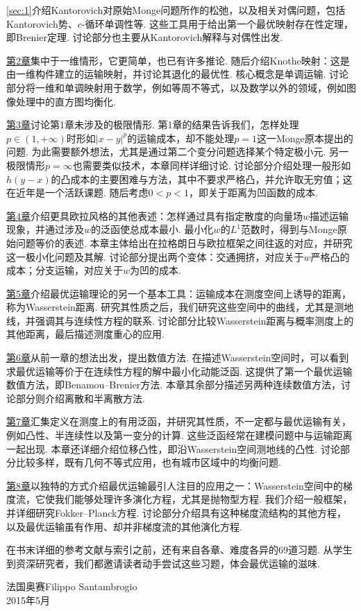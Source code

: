 \autoref{sec:1}介绍Kantorovich对原始Monge问题所作的松弛，以及相关对偶问题，包括Kantorovich势、$c$-循环单调性等. 这些工具用于给出第一个最优映射存在性定理，即Brenier定理. 讨论部分也主要从Kantorovich解释与对偶性出发.

\hyperref[sec:2]{第2章}集中于一维情形，它更简单，也已有许多推论. 随后介绍Knothe映射：这是由一维构件建立的运输映射，并讨论其退化的最优性. 核心概念是单调运输. 讨论部分将一维和单调映射用于数学，例如等周不等式，以及数学以外的领域，例如图像处理中的直方图均衡化.

\hyperref[sec:3]{第3章}讨论第1章未涉及的极限情形. 第1章的结果告诉我们，怎样处理$p\in(1,+\infty)$时形如$|x-y|^p$的运输成本，却不能处理$p=1$这一Monge原本提出的问题. 为此需要额外想法，尤其是通过第二个变分问题选择某个特定极小元. 另一极限情形$p=\infty$也需要类似技术，本章同样详细讨论. 讨论部分介绍处理一般形如$h(y-x)$的凸成本的主要困难与方法，其中不要求严格凸，并允许取无穷值；这在近年是一个活跃课题. 随后考虑$0<p<1$，即关于距离为凹函数的成本.

\hyperref[sec:4]{第4章}介绍更具欧拉风格的其他表述：怎样通过具有指定散度的向量场$w$描述运输现象，并通过涉及$w$的泛函使总成本最小. 最小化$w$的$L^1$范数时，得到与Monge原始问题等价的表述. 本章主体给出在拉格朗日与欧拉框架之间往返的对应，并研究这一极小化问题及其解. 讨论部分提出两个变体：交通拥挤，对应关于$w$严格凸的成本；分支运输，对应关于$w$为凹的成本.

\hyperref[sec:5]{第5章}介绍最优运输理论的另一个基本工具：运输成本在测度空间上诱导的距离，称为Wasserstein距离. 研究其性质之后，我们研究这些空间中的曲线，尤其是测地线，并强调其与连续性方程的联系. 讨论部分比较Wasserstein距离与概率测度上的其他距离，最后描述测度重心的应用.

\hyperref[sec:6]{第6章}从前一章的想法出发，提出数值方法. 在描述Wasserstein空间时，可以看到求最优运输等价于在连续性方程的解中最小化动能泛函. 这提供了第一个最优运输数值方法，即Benamou--Brenier方法. 本章其余部分描述另两种连续数值方法，讨论部分则介绍离散和半离散方法.

\hyperref[sec:7]{第7章}汇集定义在测度上的有用泛函，并研究其性质，不一定都与最优运输有关，例如凸性、半连续性以及第一变分的计算. 这些泛函经常在建模问题中与运输距离一起出现. 本章还详细介绍位移凸性，即沿Wasserstein空间测地线的凸性. 讨论部分比较多样，既有几何不等式应用，也有城市区域中的均衡问题.

\hyperref[sec:8]{第8章}以独特的方式介绍最优运输最引人注目的应用之一：Wasserstein空间中的梯度流，它使我们能够处理许多演化方程，尤其是抛物型方程. 我们介绍一般框架，并详细研究Fokker--Planck方程. 讨论部分介绍具有这种梯度流结构的其他方程，以及最优运输虽有作用、却并非梯度流的其他演化方程.

在书末详细的参考文献与索引之前，还有来自各章、难度各异的69道习题. 从学生到资深研究者，我们都邀请读者动手尝试这些习题，体会最优运输的滋味.

\begin{flushright}法国奥赛\hfill Filippo Santambrogio\\2015年5月\end{flushright}
